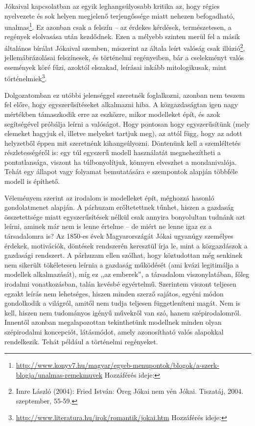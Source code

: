 \documentclass[a4paper,12pt]{thesis-ekf}
\begin{document}
    Jókaival kapcsolatban az egyik leghangsúlyosabb kritika az, hogy régies nyelvezete és sok helyen megjelenő 
        terjengőssége miatt nehezen befogadható, unalmas\footnote{
            \url{http://www.konyv7.hu/magyar/egyeb-menupontok/blogok/a-szerk-blogja/unalmas-remekmuvek}
            Hozzáférés ideje: }.
    Ez azonban csak a felszín – az érdekes kérdések, természetesen, a regények elolvasása után kezdődnek.
    Ezen a mélyebb szinten merül fel a másik általános bírálat Jókaival szemben, miszerint az általa leírt valóság csak 
        illúzió\footnote{Imre László (2004): Fried István: Öreg Jókai nem vén Jókai. Tiszatáj, 2004. szeptember, 55-59.},
        jellemábrázolásai felszínesek, és történelmi regényeiben, bár a cselekményt valós események köré fűzi,
        azoktól elszakad, leírásai inkább mitologikusak, mint történelmiek\footnote{
            \url{http://www.literatura.hu/irok/romantik/jokai.htm}
            Hozzáférés ideje: }.

    Dolgozatomban ez utóbbi jelenséggel szeretnék foglalkozni, azonban nem teszem fel előre, hogy egyszerűsítéseket
        alkalmazni hiba.
    A közgazdaságtan igen nagy mértékben támaszkodik erre az eszközre, mikor modelleket épít, és azok segítségével
        próbálja leírni a valóságot.
    Hogy pontosan hogy egyszerűsítünk (mely elemeket hagyjuk el, illetve melyeket tartjuk meg), az attól függ,
        hogy az adott helyzetből éppen mit szeretnénk kihangsúlyozni.
    Döntenünk kell a szemléltetés részletességéről is: egy túl egyszerű modell használatát megnehezítheti a
        pontatlansága, viszont ha túlbonyolítjuk, könnyen elveszhet a mondanivalója.
    Tehát egy állapot vagy folyamat bemutatására e szempontok alapján többféle modell is építhető.

    Véleményem szerint az irodalom is modelleket épít, méghozzá hasonló gondolatmenet alapján.
    A párhuzam erőltetettnek tűnhet, hiszen a gazdaság összetettsége miatt egyszerűsítések nélkül csak annyira
        bonyolultan tudnánk azt leírni, aminek már nem is lenne értelme – de miért ne lenne igaz ez a társadalomra is?
    Az 1850-es évek Magyarországát Jókai ugyanúgy személyes érdekek, motivációk, döntések rendszerén keresztül írja le,
        mint a közgazdászok a gazdasági rendszert.
    A párhuzam ellen szólhat, hogy köztudottan még senkinek nem sikerült tökéletesen leírnia a gazdaság működését
        (ami kvázi legitimálja a modellek alkalmazását), míg ez ,,az emberek'', a társadalom viszonylatában,
        főleg irodalmi vonatkozásban, talán kevésbé egyértelmű.
    Szerintem viszont teljesen egzakt leírás nem lehetséges, hiszen minden szerző sajátos, egyéni módon gondolkodik
        a világról, amitől nem tudja teljesen függetleníteni magát.
    Nem is kell, hiszen nem tudományos igényű művekről van szó, hanem szépirodalomról.
    Innentől azonban megalapozottan tekinthetünk modellnek minden olyan szépirodalmi koncepciót, látásmódot,
        amely azonosítható valós alapokkal rendelkezik.
    Tehát például a történelmi regényeket.
\end{document}
